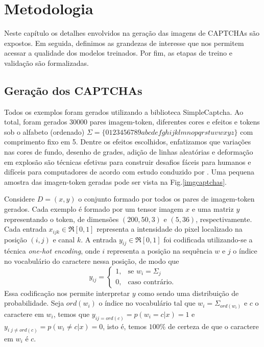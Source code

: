 \chapter{Metodologia} \label{metodologia}

Neste capítulo os detalhes envolvidos na geração das imagens de CAPTCHAs são expostos. Em seguida, definimos as grandezas de interesse que nos permitem acessar a qualidade dos modelos treinados. Por fim, as etapas de treino e validação são formalizadas.


\section{Geração dos CAPTCHAs}

Todos os exemplos foram gerados utilizando a biblioteca SimpleCaptcha\cite{simplecaptcha}. Ao total, foram gerados $30000$ pares imagem-token, diferentes cores e efeitos e tokens sob o alfabeto (ordenado) $\Sigma = \{0123456789abcdefghijklmnopqrstuvwxyz\}$ com comprimento fixo em 5. Dentre os efeitos escolhidos, enfatizamos que variações nas cores de fundo, desenho de grades, adição de linhas aleatórias e deformação em explosão são técnicas efetivas para construir desafios fáceis para humanos e difíceis para computadores de acordo com estudo conduzido por \cite{lectures2005HIP}. Uma pequena amostra das imagen-token geradas pode ser vista na Fig.\ref{imgcaptchas}. 


Considere $D = {(x, y)}$ o conjunto formado por todos os pares de imagem-token gerados. Cada exemplo é formado por um tensor imagem $x$ e uma matriz $y$ representando o token, de dimensões $(200, 50, 3)$ e $(5, 36)$, respectivamente. Cada entrada $x_{ijk} \in \Re[0,1]$ representa a intensidade do pixel localizado na posição $(i,j)$ e canal $k$. A entrada $y_{ij} \in \Re[0,1]$ foi codificada utilizando-se a técnica \textit{one-hot encoding}, onde $i$ representa a posição na sequência $w$ e $j$ o índice no vocabulário do caractere nessa posição, de modo que 
\begin{equation}
   y_{ij}= 
	\begin{cases}
		1,	& \text{se } w_i = \Sigma_j\\
		0,  & \text{caso contrário.}
	\end{cases}
\end{equation}
Essa codificação nos permite interpretar $y$ como sendo uma distribuição de probabilidade. Seja $ord(w_i)$ o índice no vocabulário tal que $w_i = \Sigma_{ord(w_i)}$ e $c$ o caractere em $w_i$, temos que $y_{ij = ord(c)} = p(w_i=c|x) = 1$ e $y_{i\;j \neq ord(c)} = p(w_i \neq c|x) = 0$, isto é, temos $100\%$ de certeza de que o caractere em $w_i$ é $c$.

